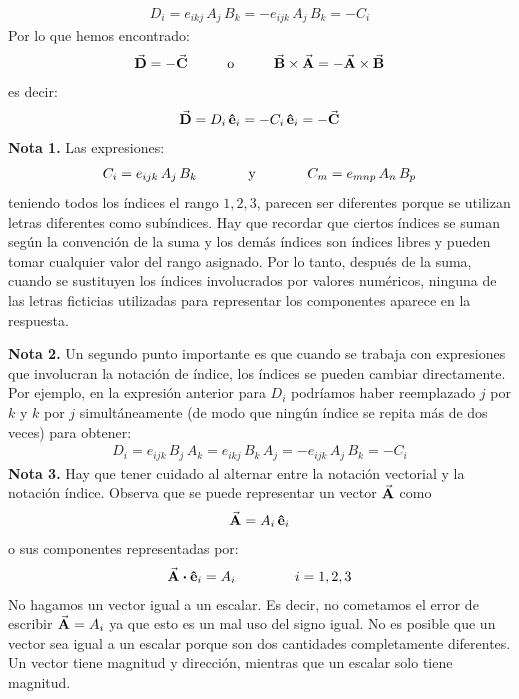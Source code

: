 \documentclass[hidelinks,12pt]{article}
\begin{document}
\begin{align*}
    D_{i} = e_{ikj} \, A_{j} \, B_{k} = - e_{ijk} \, A_{j} \, B_{k} = - C_{i}
\end{align*}
Por lo que hemos encontrado:
\begin{align*}
    \va{D} = - \va{C} \hspace{1cm} \mbox{o} \hspace{1cm} \va{B} \times \va{A} = - \va{A} \times \va{B}
\end{align*}
es decir:
\begin{align*}
    \va{D} = D_{i} \, \vu{e}_{i} = - C_{i} \, \vu{e}_{i} = - \va{C}
\end{align*}
\textbf{Nota 1. } Las expresiones:
\begin{align*}
C_{i} = e_{ijk} \, A_{j} \, B_{k} \hspace{1.3cm} \text{y} \hspace{1.3cm} C_{m} = e_{mnp} \, A_{n} \, B_{p}
\end{align*}
teniendo todos los índices el rango $1, 2, 3$, parecen ser diferentes porque se utilizan letras diferentes como subíndices. Hay que recordar que ciertos índices se suman según la convención de la suma y los demás índices son índices libres y pueden tomar cualquier valor del rango asignado. Por lo tanto, después de la suma, cuando se sustituyen los índices involucrados por valores numéricos, ninguna de las letras ficticias utilizadas para representar los componentes aparece en la respuesta.
\par
\noindent
\textbf{Nota 2. } Un segundo punto importante es que cuando se trabaja con expresiones que involucran la notación de índice, los índices se pueden cambiar directamente. Por ejemplo, en la expresión anterior para $D_{i}$ podríamos haber reemplazado $j$ por $k$ y $k$ por $j$ simultáneamente (de modo que ningún índice se repita más de dos veces) para obtener:
\begin{align*}
D_{i} = e_{ijk} \, B_{j} \, A_{k} = e_{ikj} \, B_{k} \, A_{j} = - e_{ijk} \, A_{j} \, B_{k} = - C_{i}
\end{align*}
\noindent
\textbf{Nota 3. } Hay que tener cuidado al alternar entre la notación vectorial y la notación índice. Observa que se puede representar un vector $\va{A}$ como
\begin{align*}
\va{A} = A_{i} \, \vu{e}_{i}
\end{align*}
o sus componentes representadas por:
\begin{align*}
\va{A} \vdot \vu{e}_{i} = A_{i} \hspace{1.5cm} i = 1, 2, 3
\end{align*}
No hagamos un vector igual a un escalar. Es decir, no cometamos el error de escribir $\va{A} = A_{i}$ ya que esto es un mal uso del signo igual. No es posible que un vector sea igual a un escalar porque son dos cantidades completamente diferentes. Un vector tiene magnitud y dirección, mientras que un escalar solo tiene magnitud.
\end{document}
